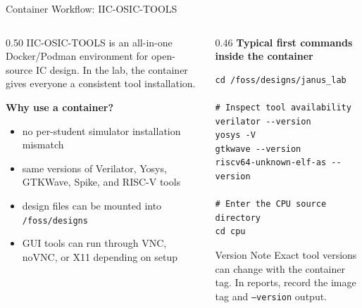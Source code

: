 \documentclass[aspectratio=169,10pt]{beamer}
\begin{document}
\begin{frame}[fragile]{Container Workflow: IIC-OSIC-TOOLS}
  \begin{columns}[T]
    \begin{column}{0.50\textwidth}
      IIC-OSIC-TOOLS is an all-in-one Docker/Podman environment for open-source IC design. In the lab, the container gives everyone a consistent tool installation.

      \vspace{0.7em}
      \textbf{Why use a container?}
      \begin{itemize}
        \item no per-student simulator installation mismatch
        \item same versions of Verilator, Yosys, GTKWave, Spike, and RISC-V tools
        \item design files can be mounted into \texttt{/foss/designs}
        \item GUI tools can run through VNC, noVNC, or X11 depending on setup
      \end{itemize}
    \end{column}
    \begin{column}{0.46\textwidth}
      \textbf{Typical first commands inside the container}
\begin{lstlisting}[language=Shell]
cd /foss/designs/janus_lab

# Inspect tool availability
verilator --version
yosys -V
gtkwave --version
riscv64-unknown-elf-as --version

# Enter the CPU source directory
cd cpu
\end{lstlisting}

      \vspace{0.4em}
      \begin{alertblock}{Version Note}
        Exact tool versions can change with the container tag. In reports, record the image tag and \texttt{--version} output.
      \end{alertblock}
    \end{column}
  \end{columns}
\end{frame}
\end{document}

